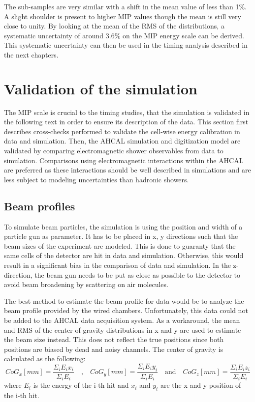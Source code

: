 The sub-samples are very similar with a shift in the mean value of less than 1\%. A slight shoulder is present to higher MIP values though the mean is still very close to unity. By looking at the mean of the RMS of the distributions, a systematic uncertainty of around 3.6\% on the MIP energy scale can be derived. This systematic uncertainty can then be used in the timing analysis described in the next chapters.

\section{Validation of the simulation}
\label{sec:SimulationVal}

The MIP scale is crucial to the timing studies, that the simulation is validated in the following text in order to ensure its description of the data. This section first describes cross-checks performed to validate the cell-wise energy calibration in data and simulation. Then, the AHCAL simulation and digitization model are validated by comparing electromagnetic shower observables from data to simulation. Comparisons using electromagnetic interactions within the AHCAL are preferred as these interactions should be well described in simulations and are less subject to modeling uncertainties than hadronic showers.

\subsection{Beam profiles}

To simulate beam particles, the simulation is using the position and width of a particle gun as parameter. It has to be placed in x, y directions such that the beam sizes of the experiment are modeled. This is done to guaranty that the same cells of the detector are hit in data and simulation. Otherwise, this would result in a significant bias in the comparison of data and simulation. In the z-direction, the beam gun needs to be put as close as possible to the detector to avoid beam broadening by scattering on air molecules.

The best method to estimate the beam profile for data would be to analyze the beam profile provided by the wired chambers. Unfortunately, this data could not be added to the AHCAL data acquisition system. As a workaround, the mean and RMS of the center of gravity distributions in x and y are used to estimate the beam size instead. This does not reflect the true positions since both positions are biased by dead and noisy channels. The center of gravity is calculated as the following:
\begin{equation}
	CoG_x [mm] = \frac{\Sigma_i E_i x_i}{\Sigma_i E_i} \quad \text{,} \quad CoG_y [mm] = \frac{\Sigma_i E_i y_i}{\Sigma_i E_i} \quad \text{and} \quad CoG_z [mm] = \frac{\Sigma_i E_i z_i}{\Sigma_i E_i}
\end{equation}
where $E_i$ is the energy of the i-th hit and $x_i$ and $y_i$ are the x and y position of the i-th hit.

